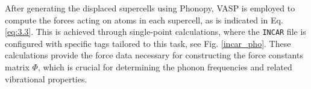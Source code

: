 After generating the displaced supercells using Phonopy, VASP is employed to compute the forces acting on atoms in each supercell, as is indicated in Eq. \ref{eq:3.3}. This is achieved through single-point calculations, where the \texttt{INCAR} file is configured with specific tags tailored to this task, see Fig. \ref{incar_pho}. These calculations provide the force data necessary for constructing the force constants matrix \( \Phi \), which is crucial for determining the phonon frequencies and related vibrational properties.

\begin{figure}[H]
\end{figure}
